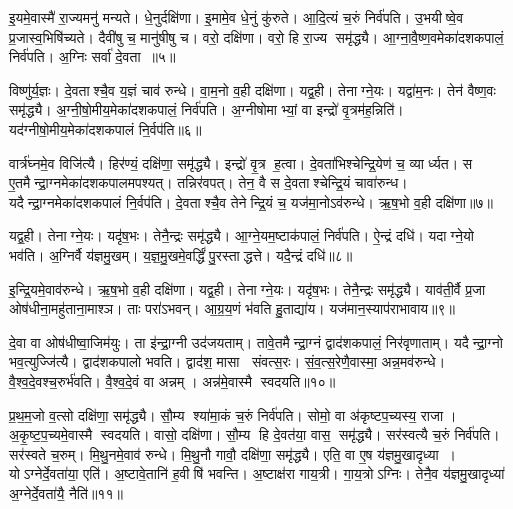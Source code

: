 इ॒यमे॒वास्मै॑ रा॒ज्यमनु॑ मन्यते।
धे॒नुर्दक्षि॑णा।
इ॒मामे॒व धे॒नुं कु॑रुते।
आ॒दि॒त्यं च॒रुं निर्व॑पति।
उ॒भयीष्वे॒व प्र॒जास्व॒भिषि॑च्यते।
दैवी॑षु च॒ मानु॑षीषु च।
वरो॒ दक्षि॑णा।
वरो॒ हि रा॒ज्य समृ॑द्ध्यै।
आ॒ग्ना॒वै॒ष्ण॒वमेका॑दशकपालं॒ निर्व॑पति।
अ॒ग्निः सर्वा॑ दे॒वता॥५॥

विष्णु॑र्\mbox{}य॒ज्ञः।
दे॒वताश्चै॒व य॒ज्ञं चाव॑ रुन्धे।
वा॒म॒नो व॒ही दक्षि॑णा।
यद्व॒ही।
तेनाग्ने॒यः।
यद्वा॑म॒नः।
तेन॑ वैष्ण॒वः समृ॑द्ध्यै।
अ॒ग्नी॒षो॒मीय॒मेका॑दशकपालं॒ निर्व॑पति।
अ॒ग्नीषोमाभ्यां॒ वा इन्द्रो॑ वृ॒त्रम॑ह॒न्निति॑।
यद॑ग्नीषो॒मीय॒मेका॑दशकपालं नि॒र्वप॑ति॥६॥

वार्त्र॑घ्नमे॒व विजि॑त्यै।
हिर॑ण्यं॒ दक्षि॑णा॒ समृ॑द्ध्यै।
इन्द्रो॑ वृ॒त्र ह॒त्वा।
दे॒वता॑भिश्चेन्द्रि॒येण॑ च॒ व्यार्ध्यत।
स ए॒तमैन्द्रा॒ग्नमेका॑दशकपालमपश्यत्।
तन्निर॑वपत्।
तेन॒ वै स दे॒वताश्चेन्द्रि॒यं चावा॑रुन्ध।
यदैन्द्रा॒ग्नमेका॑दशकपालं नि॒र्वप॑ति।
दे॒वताश्चै॒व तेनेन्द्रि॒यं च॒ यज॑मा॒नोऽव॑रुन्धे।
ऋ॒ष॒भो व॒ही दक्षि॑णा॥७॥

यद्व॒ही।
तेनाग्ने॒यः।
यदृ॑ष॒भः।
तेनै॒न्द्रः समृ॑द्ध्यै।
आ॒ग्ने॒यम॒ष्टाक॑पालं॒ निर्व॑पति।
ऐ॒न्द्रं दधि॑।
यदाग्ने॒यो भव॑ति।
अ॒ग्निर्वै य॑ज्ञमु॒खम्।
य॒ज्ञ॒मु॒खमे॒वर्द्धिं॑ पु॒रस्ताद्धत्ते।
यदै॒न्द्रं दधि॑॥८॥

इ॒न्द्रि॒यमे॒वाव॑रुन्धे।
ऋ॒ष॒भो व॒ही दक्षि॑णा।
यद्व॒ही।
तेनाग्ने॒यः।
यदृ॑ष॒भः।
तेनै॒न्द्रः समृ॑द्ध्यै।
याव॑ती॒र्वै प्र॒जा ओष॑धीना॒महु॑ताना॒माश्ञ\sn{}।
ताः परा॑ऽभवन्।
आ॒ग्र॒य॒णं भ॑वति हु॒ताद्या॑य।
यज॑मान॒स्याप॑राभावाय॥९॥

दे॒वा वा ओष॑धीष्वा॒जिम॑युः।
ता इ॑न्द्रा॒ग्नी उद॑जयताम्।
तावे॒तमैन्द्रा॒ग्नं द्वाद॑शकपालं॒ निर॑वृणाताम्।
यदैन्द्रा॒ग्नो भव॒त्युज्जि॑त्यै।
द्वाद॑शकपालो भवति।
द्वाद॑श॒ मासा संवत्स॒रः।
सं॒व॒त्स॒रेणै॒वास्मा॒ अन्न॒मव॑रुन्धे।
वै॒श्व॒दे॒वश्च॒रुर्भ॑वति।
वै॒श्व॒दे॒वं वा अन्नम्।
अन्न॑मे॒वास्मै स्वदयति॥१०॥

प्र॒थ॒म॒जो व॒त्सो दक्षि॑णा॒ समृ॑द्ध्यै।
सौ॒म्य श्या॑मा॒कं च॒रुं निर्व॑पति।
सोमो॒ वा अ॑कृष्टप॒च्यस्य॒ राजा।
अ॒कृ॒ष्ट॒प॒च्यमे॒वास्मै स्वदयति।
वासो॒ दक्षि॑णा।
सौ॒म्य हि दे॒वत॑या॒ वास॒ समृ॑द्ध्यै।
सर॑स्वत्यै च॒रुं निर्व॑पति।
सर॑स्वते च॒रुम्।
मि॒थु॒नमे॒वाव॑ रुन्धे।
मि॒थु॒नौ गावौ॒ दक्षि॑णा॒ समृ॑द्ध्यै।
एति॒ वा ए॒ष य॑ज्ञमु॒खादृध्या।
योऽग्नेर्दे॒वता॑या॒ एति॑।
अ॒ष्टावे॒तानि॑ ह॒वीषि॑ भवन्ति।
अ॒ष्टाक्ष॑रा गाय॒त्री।
गा॒य॒त्रोऽग्निः।
तेनै॒व य॑ज्ञमु॒खादृध्या॑ अ॒ग्नेर्दे॒वता॑यै॒ नैति॑॥११॥

